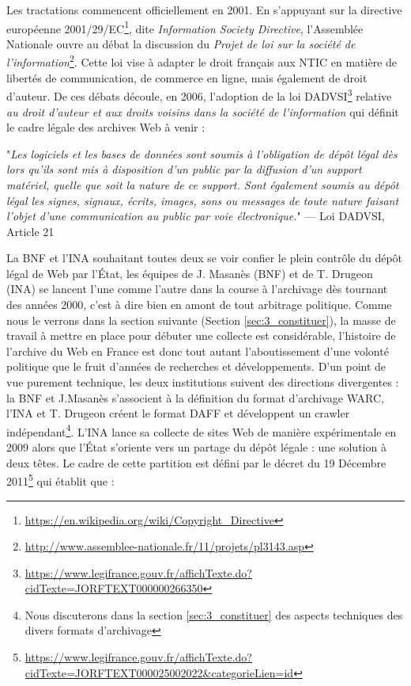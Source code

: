 \documentclass[symmetric,justified,marginals=raggedouter]{tufte-book}
\begin{document}
Les tractations commencent officiellement en 2001. En s'appuyant sur la directive européenne 2001/29/EC\footnote{\url{https://en.wikipedia.org/wiki/Copyright\_Directive}}, dite \textit{Information Society Directive}, l'Assemblée Nationale ouvre au débat la discussion du \textit{Projet de loi sur la société de l'information}\footnote{\url{http://www.assemblee-nationale.fr/11/projets/pl3143.asp}}. Cette loi vise à adapter le droit français aux NTIC en matière de libertés de communication, de commerce en ligne, mais également de droit d'auteur. De ces débats découle, en 2006, l'adoption de la loi DADVSI\footnote{\url{https://www.legifrance.gouv.fr/affichTexte.do?cidTexte=JORFTEXT000000266350}} relative \textit{au droit d'auteur et aux droits voisins dans la société de l'information} qui définit le cadre légale des archives Web à venir :\\

\begin{fullwidth}

"\textit{Les logiciels et les bases de données sont soumis à l’obligation de dépôt légal dès lors qu’ils sont mis à disposition d’un public par la diffusion d’un support matériel, quelle que soit la nature de ce support. Sont également soumis au dépôt légal les signes, signaux, écrits, images, sons ou messages de toute nature faisant l’objet d’une communication au public par voie électronique.}" --- Loi DADVSI, Article 21\\

\end{fullwidth}

\noindent La BNF et l'INA souhaitant toutes deux se voir confier le plein contrôle du dépôt légal de Web par l'État, les équipes de J. Masanès (BNF) et de T. Drugeon (INA) se lancent l'une comme l'autre dans la course à l'archivage dès tournant des années 2000, c'est à dire bien en amont de tout arbitrage politique. Comme nous le verrons dans la section suivante (Section \ref{sec:3_constituer}), la masse de travail à mettre en place pour débuter une collecte est considérable, l'histoire de l'archive du Web en France est donc tout autant l'aboutissement d'une volonté politique que le fruit d'années de recherches et développements. D'un point de vue purement technique, les deux institutions suivent des directions divergentes : la BNF et J.Masanès s'associent à la définition du format d'archivage WARC, l'INA et T. Drugeon créent le format DAFF et développent un crawler indépendant\footnote{Nous discuterons dans la section \ref{sec:3_constituer} des aspects techniques des divers formats d'archivage}. L'INA lance sa collecte de sites Web de manière expérimentale en 2009 alors que l'État s'oriente vers un partage du dépôt légale : une solution à deux têtes. Le cadre de cette partition est défini par le décret du 19 Décembre 2011\footnote{\url{https://www.legifrance.gouv.fr/affichTexte.do?cidTexte=JORFTEXT000025002022&categorieLien=id}} qui établit que :
\end{document}
